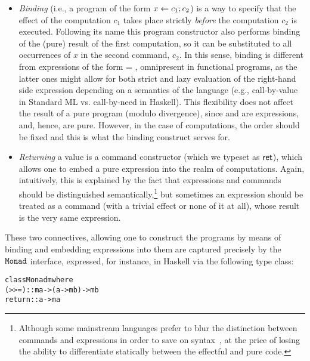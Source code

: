 \begin{itemize}
\item  \textit{Binding} (i.e., a program of the form $x \leftarrow c_1; c_2$) is a way
  to specify that the effect of the computation $c_1$ takes place
  strictly \textit{before} the computation $c_2$ is executed. Following its
  name this program constructor also performs binding of the (pure)
  result of the first computation, so it can be substituted to all
  occurrences of $x$ in the second command, $c_2$. In this sense,
  binding is different from expressions of the form   =  
  , omnipresent in functional programs, as the latter ones might allow
  for both strict and lazy evaluation of the right-hand side
  expression  depending on a semantics of the language (e.g.,
  call-by-value in Standard ML vs. call-by-need in Haskell). This
  flexibility does not affect the result of a pure program (modulo
  divergence), since  and  are expressions, and, hence, are
  pure. However, in the case of computations, the order should be
  fixed and this is what the binding construct serves for.

\item  \textit{Returning} a value is a command constructor (which we typeset as
  $\mathsf{ret}$), which allows one to embed a pure expression into the realm
  of computations. Again, intuitively, this is explained by the fact
  that expressions and commands should be distinguished
  semantically,\footnote{Although some mainstream languages prefer to
  blur the distinction between commands and expressions in order to
  save on syntax~\cite{Scala-spec}, at the price of losing the ability
  to differentiate statically between the effectful and pure code.}
  but sometimes an expression should be treated as a command (with a
  trivial effect or none of it at all), whose result is the very same
  expression.

\end{itemize}
These two connectives, allowing one to construct the programs by means
of binding and embedding expressions into them are captured precisely
by the $\mathtt{Monad}$ interface, expressed, for instance, in Haskell
via the following type class:

\begin{alltt}
class Monad m where
    (>>=)            :: m a -> (a -> m b) -> m b
    return           :: a -> m a
\end{alltt}

